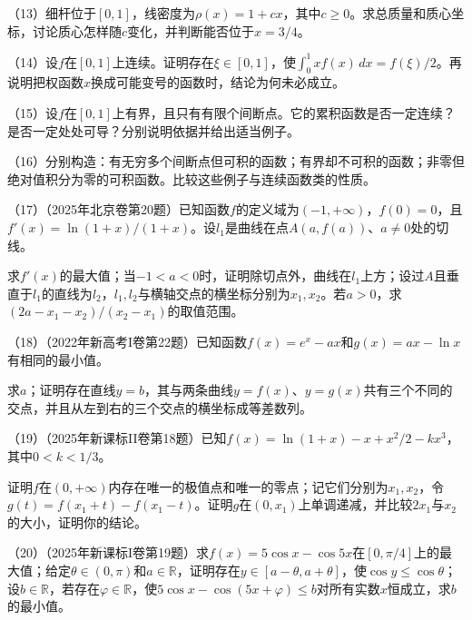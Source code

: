 \begin{exercise}
（13）细杆位于\([0,1]\)，线密度为\(\rho(x)=1+cx\)，其中\(c\ge0\)。求总质量和质心坐标，讨论质心怎样随\(c\)变化，并判断能否位于\(x=3/4\)。

（14）设\(f\)在\([0,1]\)上连续。证明存在\(\xi\in[0,1]\)，使\(\int_0^1xf(x)\,dx=f(\xi)/2\)。再说明把权函数\(x\)换成可能变号的函数时，结论为何未必成立。

（15）设\(f\)在\([0,1]\)上有界，且只有有限个间断点。它的累积函数是否一定连续？是否一定处处可导？分别说明依据并给出适当例子。

（16）分别构造：有无穷多个间断点但可积的函数；有界却不可积的函数；非零但绝对值积分为零的可积函数。比较这些例子与连续函数类的性质。

（17）（2025年北京卷第20题）已知函数\(f\)的定义域为\((-1,+\infty)\)，\(f(0)=0\)，且\(f'(x)=\ln(1+x)/(1+x)\)。设\(l_1\)是曲线在点\(A(a,f(a))\)、\(a\ne0\)处的切线。

\quad {}求\(f'(x)\)的最大值；当\(-1<a<0\)时，证明除切点外，曲线在\(l_1\)上方；设过\(A\)且垂直于\(l_1\)的直线为\(l_2\)，\(l_1,l_2\)与横轴交点的横坐标分别为\(x_1,x_2\)。若\(a>0\)，求\((2a-x_1-x_2)/(x_2-x_1)\)的取值范围。

（18）（2022年新高考I卷第22题）已知函数\(f(x)=e^x-ax\)和\(g(x)=ax-\ln x\)有相同的最小值。

\quad {}求\(a\)；证明存在直线\(y=b\)，其与两条曲线\(y=f(x)\)、\(y=g(x)\)共有三个不同的交点，并且从左到右的三个交点的横坐标成等差数列。

（19）（2025年新课标II卷第18题）已知\(f(x)=\ln(1+x)-x+x^2/2-kx^3\)，其中\(0<k<1/3\)。

\quad {}证明\(f\)在\((0,+\infty)\)内存在唯一的极值点和唯一的零点；记它们分别为\(x_1,x_2\)，令\(g(t)=f(x_1+t)-f(x_1-t)\)。证明\(g\)在\((0,x_1)\)上单调递减，并比较\(2x_1\)与\(x_2\)的大小，证明你的结论。

（20）（2025年新课标I卷第19题）求\(f(x)=5\cos x-\cos5x\)在\([0,\pi/4]\)上的最大值；给定\(\theta\in(0,\pi)\)和\(a\in\mathbb R\)，证明存在\(y\in[a-\theta,a+\theta]\)，使\(\cos y\le\cos\theta\)；设\(b\in\mathbb R\)，若存在\(\varphi\in\mathbb R\)，使\(5\cos x-\cos(5x+\varphi)\le b\)对所有实数\(x\)恒成立，求\(b\)的最小值。

\end{exercise}

